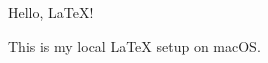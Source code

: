 \documentclass{article}
\begin{document}
Hello, LaTeX!

This is my local LaTeX setup on macOS.
\end{document}
